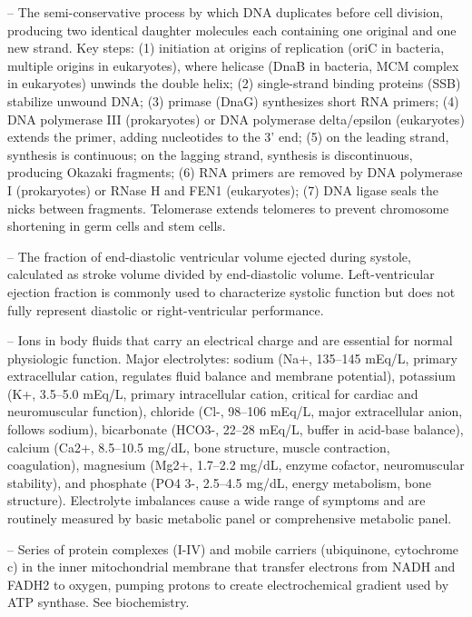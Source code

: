 -- The semi-conservative process by which DNA duplicates before cell division, producing two identical daughter molecules each containing one original and one new strand. Key steps: (1) initiation at origins of replication (oriC in bacteria, multiple origins in eukaryotes), where helicase (DnaB in bacteria, MCM complex in eukaryotes) unwinds the double helix; (2) single-strand binding proteins (SSB) stabilize unwound DNA; (3) primase (DnaG) synthesizes short RNA primers; (4) DNA polymerase III (prokaryotes) or DNA polymerase delta/epsilon (eukaryotes) extends the primer, adding nucleotides to the 3' end; (5) on the leading strand, synthesis is continuous; on the lagging strand, synthesis is discontinuous, producing Okazaki fragments; (6) RNA primers are removed by DNA polymerase I (prokaryotes) or RNase H and FEN1 (eukaryotes); (7) DNA ligase seals the nicks between fragments. Telomerase extends telomeres to prevent chromosome shortening in germ cells and stem cells.

-- The fraction of end-diastolic ventricular volume ejected during systole, calculated as stroke volume divided by end-diastolic volume. Left-ventricular ejection fraction is commonly used to characterize systolic function but does not fully represent diastolic or right-ventricular performance.

-- Ions in body fluids that carry an electrical charge and are essential for normal physiologic function. Major electrolytes: sodium (Na+, 135--145 mEq/L, primary extracellular cation, regulates fluid balance and membrane potential), potassium (K+, 3.5--5.0 mEq/L, primary intracellular cation, critical for cardiac and neuromuscular function), chloride (Cl-, 98--106 mEq/L, major extracellular anion, follows sodium), bicarbonate (HCO3-, 22--28 mEq/L, buffer in acid-base balance), calcium (Ca2+, 8.5--10.5 mg/dL, bone structure, muscle contraction, coagulation), magnesium (Mg2+, 1.7--2.2 mg/dL, enzyme cofactor, neuromuscular stability), and phosphate (PO4 3-, 2.5--4.5 mg/dL, energy metabolism, bone structure). Electrolyte imbalances cause a wide range of symptoms and are routinely measured by basic metabolic panel or comprehensive metabolic panel.

-- Series of protein complexes (I-IV) and mobile carriers (ubiquinone, cytochrome c) in the inner mitochondrial membrane that transfer electrons from NADH and FADH2 to oxygen, pumping protons to create electrochemical gradient used by ATP synthase. See biochemistry.

